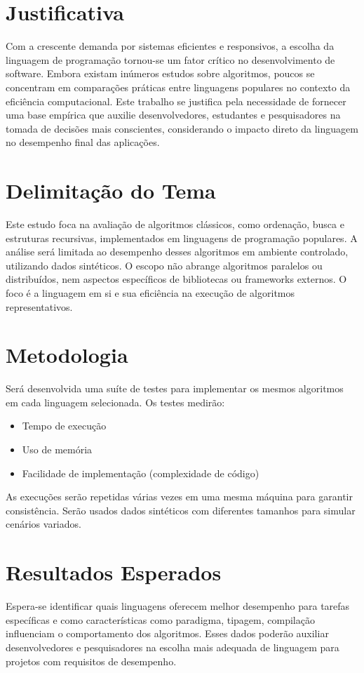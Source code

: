 \documentclass[12pt,oneside,a4paper]{report}
\begin{document}
\chapter{Justificativa}
Com a crescente demanda por sistemas eficientes e responsivos, a escolha da linguagem de programação tornou-se um fator crítico no desenvolvimento de software. Embora existam inúmeros estudos sobre algoritmos, poucos se concentram em comparações práticas entre linguagens populares no contexto da eficiência computacional. Este trabalho se justifica pela necessidade de fornecer uma base empírica que auxilie desenvolvedores, estudantes e pesquisadores na tomada de decisões mais conscientes, considerando o impacto direto da linguagem no desempenho final das aplicações.

\chapter{Delimitação do Tema}
Este estudo foca na avaliação de algoritmos clássicos, como ordenação, busca e estruturas recursivas, implementados em linguagens de programação populares. A análise será limitada ao desempenho desses algoritmos em ambiente controlado, utilizando dados sintéticos. O escopo não abrange algoritmos paralelos ou distribuídos, nem aspectos específicos de bibliotecas ou frameworks externos. O foco é a linguagem em si e sua eficiência na execução de algoritmos representativos.

\chapter{Metodologia}
Será desenvolvida uma suíte de testes para implementar os mesmos algoritmos em cada linguagem selecionada. Os testes medirão:
\begin{itemize}
    \item Tempo de execução
    \item Uso de memória
    \item Facilidade de implementação (complexidade de código)
\end{itemize}

As execuções serão repetidas várias vezes em uma mesma máquina para garantir consistência. Serão usados dados sintéticos com diferentes tamanhos para simular cenários variados.

\chapter{Resultados Esperados}
Espera-se identificar quais linguagens oferecem melhor desempenho para tarefas específicas e como características como paradigma, tipagem, compilação influenciam o comportamento dos algoritmos. Esses dados poderão auxiliar desenvolvedores e pesquisadores na escolha mais adequada de linguagem para projetos com requisitos de desempenho.



\end{document}
